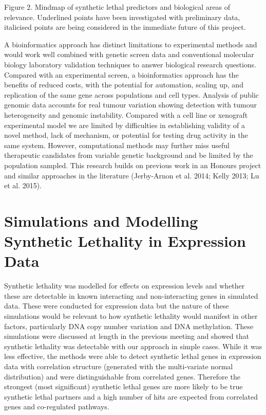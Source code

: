 Figure 2.  Mindmap of synthetic lethal predictors and biological areas of relevance.  Underlined points have been investigated with preliminary data, italicised points are being considered in the immediate future of this project.

A bioinformatics approach has distinct limitations to experimental methods and would work well combined with genetic screen data and conventional molecular biology laboratory validation techniques to answer biological research questions.  Compared with an experimental screen, a bioinformatics approach has the benefits of reduced costs, with the potential for automation, scaling up, and replication of the same gene across populations and cell types.  Analysis of public genomic data accounts for real tumour variation showing detection with tumour heterogeneity and genomic instability.  Compared with a cell line or xenograft experimental model we are limited by difficulties in establishing validity of a novel method, lack of mechanism, or potential for testing drug activity in the same system.  However, computational methods may further miss useful therapeutic candidates from variable genetic background and be limited by the population sampled.  This research builds on previous work in an Honours project and similar approaches in the literature (Jerby-Arnon et al. 2014; Kelly 2013; Lu et al. 2015).

\section{Simulations and Modelling Synthetic Lethality in Expression Data}

Synthetic lethality was modelled for effects on expression levels and whether these are detectable in known interacting and non-interacting genes in simulated data. These were conducted for expression data but the nature of these simulations would be relevant to how synthetic lethality would manifest in other factors, particularly DNA copy number variation and DNA methylation. These simulations were discussed at length in the previous meeting and showed that synthetic lethality was detectable with our approach in simple cases. While it was less effective, the methods were able to detect synthetic lethal genes in expression data with correlation structure (generated with the multi-variate normal distribution) and were distinguishable from correlated genes. Therefore the strongest (most significant) synthetic lethal genes are more likely to be true synthetic lethal partners and a high number of hits are expected from correlated genes and co-regulated pathways.

